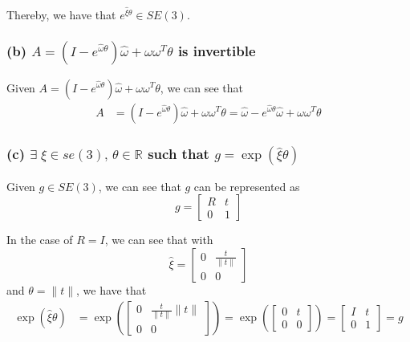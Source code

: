 Thereby, we have that \underline{\( e^{\hat{\xi} \theta} \in SE(3) \)}.

\clearpage
\subsubsection*{(b) \( A = \left(I-e^{\hat{\omega} \theta}\right) \hat{\omega}+\omega \omega^{T} \theta \) is invertible}

Given \( A = \left(I-e^{\hat{\omega} \theta}\right) \hat{\omega}+\omega \omega^{T} \theta \), we can see that
\begin{align*}
      A
       & =
      \left(I-e^{\hat{\omega} \theta}\right) \hat{\omega}+\omega \omega^{T} \theta
      =
      \hat{\omega} - e^{\hat{\omega} \theta} \hat{\omega} + \omega \omega^{T} \theta
\end{align*}

\subsubsection*{(c) \( \exists \; \xi \in se(3), \, \theta \in \mathbb{R} \) such that \( g = \exp(\hat{\xi} \theta) \)}

Given \( g \in SE(3) \), we can see that \( g \) can be represented as
\begin{equation*}
      g
      =
      \begin{bmatrix}
            R & t \\
            0 & 1
      \end{bmatrix}
\end{equation*}

In the case of \( R = I \), we can see that with
\begin{equation*}
      \hat \xi =
      \begin{bmatrix}
            0 & \frac{t}{\lVert t \rVert} \\
            0 & 0
      \end{bmatrix}
\end{equation*}
and \( \theta = \lVert t \rVert \), we have that
\begin{align*}
      \exp(\hat{\xi} \theta)
       & =
      \exp\left(
      \begin{bmatrix}
                  0 & \frac{t}{\lVert t \rVert} \lVert t \rVert \\
                  0 & 0
            \end{bmatrix}
      \right)
      =
      \exp\left(
      \begin{bmatrix}
                  0 & t \\
                  0 & 0
            \end{bmatrix}
      \right)
      =
      \begin{bmatrix}
            I & t \\
            0 & 1
      \end{bmatrix}
      =
      g
\end{align*}

